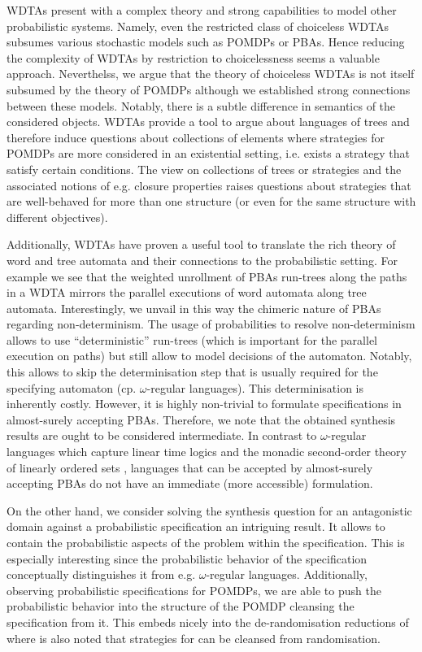 \acp{WDTA} present with a complex theory and strong capabilities to model other
probabilistic systems. Namely, even the restricted class of choiceless
\acp{WDTA} subsumes various stochastic models such as \acp{POMDP} or \acp{PBA}.
Hence reducing the complexity of \acp{WDTA} by restriction to choicelessness
seems a valuable approach. Neverthelss, we argue that the theory of choiceless
\acp{WDTA} is not itself subsumed by the theory of \acp{POMDP} although we
established strong connections between these models. Notably, there is a subtle
difference in semantics of the considered objects. \acp{WDTA} provide a tool to
argue about languages of trees and therefore induce questions about collections
of elements where strategies for \acp{POMDP} are more considered in an
existential setting, i.e. exists a strategy that satisfy certain conditions.
The view on collections of trees or strategies and the associated notions of
e.g. closure properties raises questions about strategies that are well-behaved
for more than one structure (or even for the same structure with different
objectives).

Additionally, \acp{WDTA} have proven a useful tool to translate the rich theory
of word and tree automata and their connections to the probabilistic setting.
For example we see that the weighted unrollment of \acp{PBA} run-trees along
the paths in a \ac{WDTA} mirrors the parallel executions of word automata along
tree automata. Interestingly, we unvail in this way the chimeric nature of
\acp{PBA} regarding non-determinism. The usage of probabilities to resolve
non-determinism allows to use \enquote{deterministic} run-trees (which is
important for the parallel execution on paths) but still allow to model
decisions of the automaton. Notably, this allows to skip the determinisation
step that is usually required for the specifying automaton (cp.
$\omega$-regular languages). This determinisation is inherently costly.
However, it is highly non-trivial to formulate specifications in almost-surely
accepting \acp{PBA}. Therefore, we note that the obtained synthesis results
are ought to be considered intermediate. In contrast to
$\omega$-regular languages which capture linear time logics
\cite{PrinciplesOfMC} and the monadic second-order theory of linearly ordered
sets \cite{DecMethRestArith}, languages that can be accepted by almost-surely
accepting \acp{PBA} do not have an immediate (more accessible) formulation.

On the other hand, we consider solving the synthesis question for an
antagonistic domain against a probabilistic specification an intriguing result.
It allows to contain the probabilistic aspects of the problem within the
specification. This is especially interesting since the probabilistic behavior
of the specification conceptually distinguishes it from e.g. $\omega$-regular
languages. Additionally, observing probabilistic specifications for
\acp{POMDP}, we are able to push the probabilistic behavior into the structure
of the \ac{POMDP} cleansing the specification from it. This embeds nicely into
the de-randomisation reductions of \cite{RandomnessForFree} where is also noted
that strategies for \eve{} can be cleansed from randomisation.

